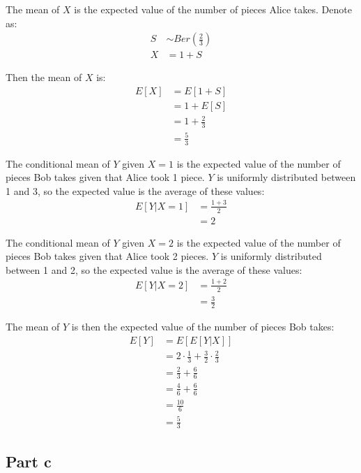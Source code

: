 The mean of $X$ is the expected value of the number of pieces Alice takes. Denote as:
\begin{align*}
	S & \sim Ber\left(\frac{2}{3}\right) \\
	X & = 1 + S
\end{align*}

Then the mean of $X$ is:
\begin{align*}
	E[X] & = E[1 + S]        \\
	     & = 1 + E[S]        \\
	     & = 1 + \frac{2}{3} \\
	     & = \frac{5}{3}
\end{align*}

The conditional mean of $Y$ given $X = 1$ is the expected value of the number of pieces Bob takes given that Alice took 1 piece. $Y$ is uniformly distributed between 1 and 3, so the expected value is the average of these values:
\begin{align*}
	E[Y | X = 1] & = \frac{1 + 3}{2} \\
	             & = 2
\end{align*}

The conditional mean of $Y$ given $X = 2$ is the expected value of the number of pieces Bob takes given that Alice took 2 pieces. $Y$ is uniformly distributed between 1 and 2, so the expected value is the average of these values:
\begin{align*}
	E[Y | X = 2] & = \frac{1 + 2}{2} \\
	             & = \frac{3}{2}
\end{align*}

The mean of $Y$ is then the expected value of the number of pieces Bob takes:
\begin{align*}
	E[Y] & = E[E[Y|X]]                                           \\
	     & = 2 \cdot \frac{1}{3} + \frac{3}{2} \cdot \frac{2}{3} \\
	     & = \frac{2}{3} + \frac{6}{6}                           \\
	     & = \frac{4}{6} + \frac{6}{6}                           \\
	     & = \frac{10}{6}                                        \\
	     & = \frac{5}{3}
\end{align*}

\subsection{Part c}

